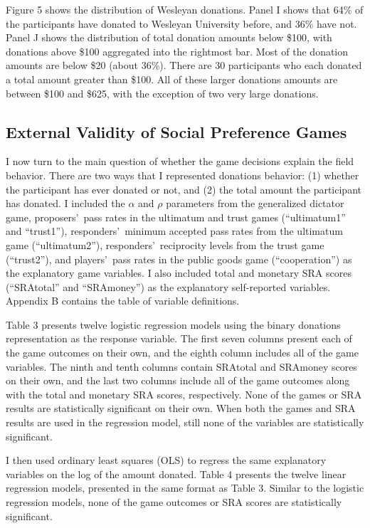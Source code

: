 \documentclass[12pt]{article}
\begin{document}
Figure 5 shows the distribution of Wesleyan donations. Panel I shows that 64\% of the participants have donated to Wesleyan University before, and 36\% have not. Panel J shows the distribution of total donation amounts below \$100, with donations above \$100 aggregated into the rightmost bar. Most of the donation amounts are below \$20 (about 36\%). There are 30 participants who each donated a total amount greater than \$100. All of these larger donations amounts are between \$100 and \$625, with the exception of two very large donations.

\subsection{External Validity of Social Preference Games}
I now turn to the main question of whether the game decisions explain the field behavior. There are two ways that I represented donations behavior: (1) whether the participant has ever donated or not, and (2) the total amount the participant has donated. I included the \(\alpha\) and \(\rho\) parameters from the generalized dictator game, proposers\rq \ pass rates in the ultimatum and trust games (``ultimatum1'' and ``trust1''), responders\rq \ minimum accepted pass rates from the ultimatum game (``ultimatum2''), responders\rq \ reciprocity levels from the trust game (``trust2''), and players\rq \ pass rates in the public goods game (``cooperation'') as the explanatory game variables. I also included total and monetary SRA scores (``SRAtotal'' and ``SRAmoney'') as the explanatory self-reported variables. Appendix B contains the table of variable definitions. 

Table 3 presents twelve logistic regression models using the binary donations representation as the response variable. The first seven columns present each of the game outcomes on their own, and the eighth column includes all of the game variables. The ninth and tenth columns contain SRAtotal and SRAmoney scores on their own, and the last two columns include all of the game outcomes along with the total and monetary SRA scores, respectively. None of the games or SRA results are statistically significant on their own. When both the games and SRA results are used in the regression model, still none of the variables are statistically significant. 

I then used ordinary least squares (OLS) to regress the same explanatory variables on the log of the amount donated. Table 4 presents the twelve linear regression models, presented in the same format as Table 3. Similar to the logistic regression models, none of the game outcomes or SRA scores are statistically significant.
\end{document}
